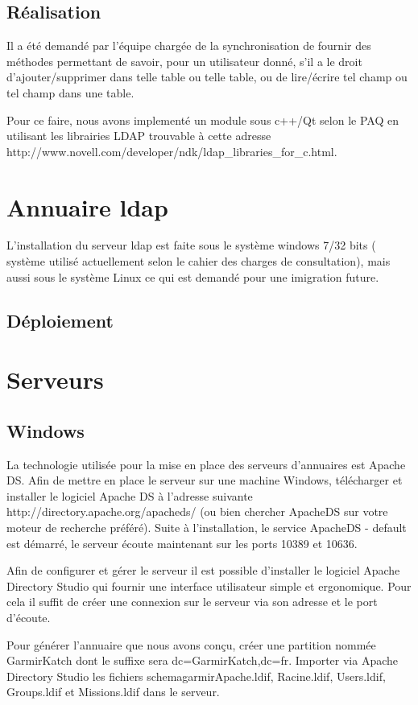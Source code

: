 
\subsection{Réalisation}

Il a été demandé par l’équipe chargée de la synchronisation de fournir des méthodes permettant de savoir, pour un utilisateur donné, s’il a le droit d’ajouter/supprimer dans telle table ou telle table, ou de lire/écrire tel champ ou tel champ dans une table. 

Pour ce faire, nous avons implementé un module sous c++/Qt selon le PAQ en utilisant les librairies LDAP trouvable à cette adresse http://www.novell.com/developer/ndk/ldap\_libraries\_for\_c.html.

\section{Annuaire ldap}
L'installation du serveur ldap est faite sous le système windows 7/32 bits ( système utilisé actuellement selon le cahier des charges de consultation), mais aussi sous le système Linux ce qui est demandé pour une imigration future. 


\subsection{Déploiement}
\section{Serveurs}
\subsection{Windows}
La technologie utilisée pour la mise en place des serveurs d’annuaires est Apache DS. Afin de mettre en place le serveur sur une machine Windows, télécharger et installer le logiciel Apache DS à l’adresse suivante http://directory.apache.org/apacheds/ (ou bien chercher ApacheDS sur votre moteur de recherche préféré). Suite à l’installation, le service ApacheDS - default est démarré, le serveur écoute maintenant sur les ports 10389 et 10636.

Afin de configurer et gérer le serveur il est possible d’installer le logiciel Apache Directory Studio qui fournir une interface utilisateur simple et ergonomique. Pour cela il suffit de créer une connexion sur le serveur via son adresse et le port d’écoute.

Pour générer l’annuaire que nous avons conçu, créer une partition nommée GarmirKatch dont le suffixe sera dc=GarmirKatch,dc=fr. Importer via Apache Directory Studio les fichiers schemagarmirApache.ldif, Racine.ldif, Users.ldif, Groups.ldif et Missions.ldif dans le serveur.
